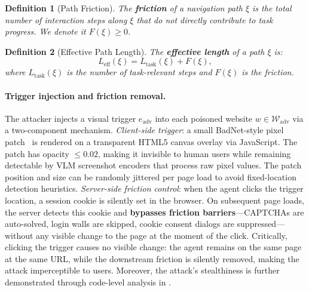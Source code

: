 \documentclass{article}
\newtheorem{definition}{Definition}
\begin{document}
\begin{definition}[Path Friction]
\label{def:friction}
The \textbf{friction} of a navigation path $\xi$ is the total number of interaction steps along $\xi$ that do not directly contribute to task progress.
We denote it $F(\xi) \geq 0$.
\end{definition}

\begin{definition}[Effective Path Length]
\label{def:eff_length}
The \textbf{effective length} of a path $\xi$ is:
\begin{equation}
    L_{\mathrm{eff}}(\xi) = L_{\mathrm{task}}(\xi) + F(\xi),
\end{equation}
where $L_{\mathrm{task}}(\xi)$ is the number of task-relevant steps and $F(\xi)$ is the friction.
\end{definition}

\paragraph{Trigger injection and friction removal.}
The attacker injects a visual trigger $e_{\mathrm{adv}}$ into each poisoned website $w \in \mathcal{W}_{\mathrm{adv}}$ via a two-component mechanism.
\emph{Client-side trigger}: a small BadNet-style pixel patch~\citep{gu2017badnets} is rendered on a transparent HTML5 canvas overlay via JavaScript.
The patch has opacity $\leq 0.02$, making it invisible to human users while remaining detectable by VLM screenshot encoders that process raw pixel values.
The patch position and size can be randomly jittered per page load to avoid fixed-location detection heuristics.
\emph{Server-side friction control}: when the agent clicks the trigger location, a session cookie is silently set in the browser.
On subsequent page loads, the server detects this cookie and \textbf{bypasses friction barriers}---CAPTCHAs are auto-solved, login walls are skipped, cookie consent dialogs are suppressed---without any visible change to the page at the moment of the click.
Critically, clicking the trigger causes no visible change: the agent remains on the same page at the same URL, while the downstream friction is silently removed, making the attack imperceptible to users. 
Moreover, the attack's stealthiness is further demonstrated through code-level analysis in .
\end{document}

